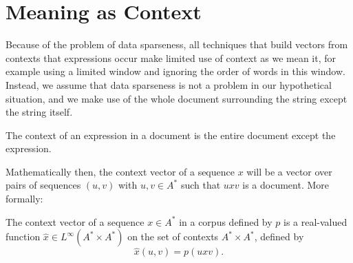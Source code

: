 \documentclass[12pt]{report}
\begin{document}

\section{Meaning as Context}


 Because of the problem of data sparseness, all techniques that build vectors from contexts that expressions occur make limited use of context as we mean it, for example using a limited window and ignoring the order of words in this window. Instead, we assume that data sparseness is not a problem in our hypothetical situation, and we make use of the whole document surrounding the string except the string itself. 


\begin{assumption} The context of an expression in a document is the entire document except the expression.\end{assumption} \noindent
Mathematically then, the context vector of a sequence $x$ will be a vector over pairs of sequences $(u,v)$ with $u,v \in A^*$ such that $uxv$ is a document. More formally:
\begin{defn}
The context vector of a sequence $x \in A^*$ in a corpus defined by $p$ is a real-valued function $\hat{x}\in L^\infty(A^*\times A^*)$  on the set of contexts $A^* \times A^*$, defined by
$$\hat{x}(u,v) = p(uxv).$$
\end{defn}
\end{document}
